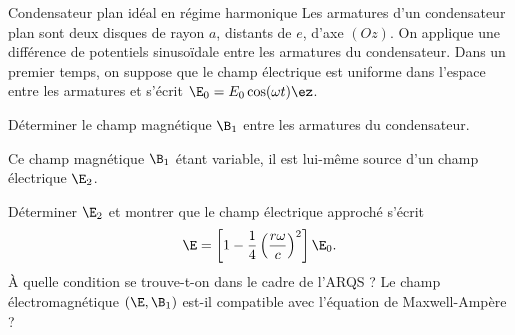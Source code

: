 \begin{exo}[PC][2][colle]{Condensateur plan idéal en régime harmonique}
  Les armatures d’un condensateur plan sont deux disques de rayon $a$, distants de $e$, d’axe $(Oz)$.
  On applique une différence de potentiels sinusoïdale entre les armatures du condensateur.
Dans un premier temps, on suppose que le champ électrique est uniforme dans l’espace entre les armatures et s’écrit $\E_0 = E_0 \cos(\omega t)\ez$. 

\begin{quest}
\item Déterminer le champ magnétique $\B_1$ entre les armatures du condensateur.
\end{quest}
Ce champ magnétique $\B_1$ étant variable, il est lui-même source d’un champ électrique $\E_2$. 


\begin{quest}
\item Déterminer $\E_2$ et montrer que le champ électrique approché s’écrit
$$
\E = \left[ 1-\frac{1}{4}\left(\frac{r\omega}{c}\right)^2\right]\E_0.
$$
À quelle condition se trouve-t-on dans le cadre de l’ARQS ?
Le champ électromagnétique $(\E,\B_1)$ est-il compatible avec l’équation de Maxwell-Ampère ?


\end{quest}
\end{exo}
